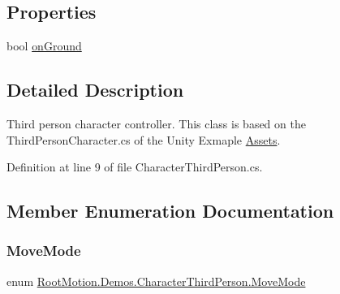 \subsection*{Properties}
\begin{DoxyCompactItemize}
\item 
bool \mbox{\hyperlink{class_root_motion_1_1_demos_1_1_character_third_person_a99fa02afaf384e5e18f4b11c647327a0}{on\+Ground}}
\end{DoxyCompactItemize}


\subsection{Detailed Description}
Third person character controller. This class is based on the Third\+Person\+Character.\+cs of the Unity Exmaple \mbox{\hyperlink{namespace_assets}{Assets}}. 



Definition at line 9 of file Character\+Third\+Person.\+cs.



\subsection{Member Enumeration Documentation}
\mbox{\label{class_root_motion_1_1_demos_1_1_character_third_person_aef170847340acae97eb1c87e647eead2}} 
\subsubsection{\texorpdfstring{Move\+Mode}{MoveMode}}
{\footnotesize\ttfamily enum \mbox{\hyperlink{class_root_motion_1_1_demos_1_1_character_third_person_aef170847340acae97eb1c87e647eead2}{Root\+Motion.\+Demos.\+Character\+Third\+Person.\+Move\+Mode}}\hspace{0.3cm}{\ttfamily [strong]}}

